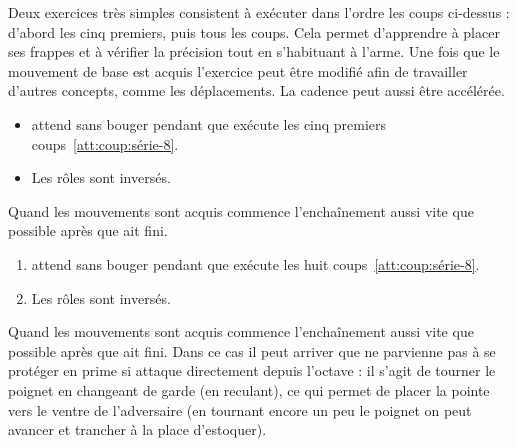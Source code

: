 Deux exercices très simples consistent à exécuter dans l'ordre les coups ci-dessus : d'abord les cinq premiers, puis tous les coups.
Cela permet d'apprendre à placer ses frappes et à vérifier la précision tout en s'habituant à l'arme.
Une fois que le mouvement de base est acquis l'exercice peut être modifié afin de travailler d'autres concepts, comme les déplacements.
La cadence peut aussi être accélérée.


\begin{exercice}


	\begin{itemize}
		\item \D attend sans bouger pendant que \A exécute les cinq premiers coups~\ref{att:coup:série-8}.
		
		\item Les rôles sont inversés.
	\end{itemize}

	Quand les mouvements sont acquis \D commence l'enchaînement aussi vite que possible après que \A ait fini.
\end{exercice}


\begin{exercice}


	\begin{enumerate}
		\item \D attend sans bouger pendant que \A exécute les huit coups~\ref{att:coup:série-8}.
		
		\item Les rôles sont inversés.
	\end{enumerate}

	Quand les mouvements sont acquis \D commence l'enchaînement aussi vite que possible après que \A ait fini.
	Dans ce cas il peut arriver que \A ne parvienne pas à se protéger en prime si \D attaque directement depuis l'octave : il s'agit de tourner le poignet en changeant de garde (en reculant), ce qui permet de placer la pointe vers le ventre de l'adversaire (en tournant encore un peu le poignet on peut avancer et trancher à la place d'estoquer).
\end{exercice}


